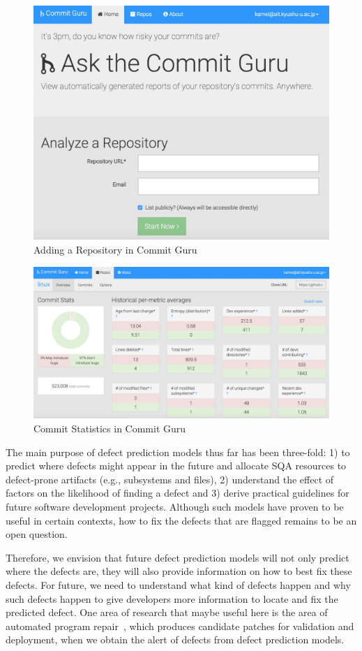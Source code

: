
\begin{figure}
  \centering
  \includegraphics[width=.4\textwidth]{figures/guru1}
  \caption{Adding a Repository in Commit Guru \label{fig:guru1}}
\end{figure}

\begin{figure}
  \centering
  \includegraphics[width=.4\textwidth]{figures/guru2}
  \caption{Commit Statistics in Commit Guru \label{fig:guru2}}
\end{figure}

The main purpose of defect prediction models thus far has been three-fold: 1) to predict where defects might appear in the future and allocate SQA resources to defect-prone artifacts (e.g., subsystems and files), 2) understand the effect of factors on the likelihood of finding a defect and 3) derive practical guidelines for future software development projects. Although such models have proven to be useful in certain contexts, how to fix the defects that are flagged remains to be an open question.

Therefore, we envision that future defect prediction models will not only predict where the defects are, they will also provide information on how to best fix these defects. For future, we need to understand what kind of defects happen and why such defects happen to give developers more information to locate and fix the predicted defect. One area of research that maybe useful here is the area of automated program repair~\cite{LeGoues2012ICSE, Mechtaev2015ICSE, Nguyen2013ICSE}, which produces candidate patches for validation and deployment, when we obtain the alert of defects from defect prediction models.

